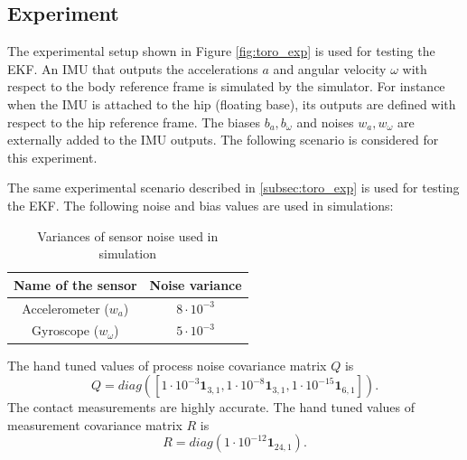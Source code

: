 \subsection{Experiment}

The experimental setup shown in Figure \ref{fig:toro_exp} is used for testing the EKF. An IMU that outputs the accelerations $a$ and angular velocity $\omega$ with respect to the body reference frame is simulated by the simulator. For instance when the IMU is attached to the hip (floating base), its outputs are defined with respect to the hip reference frame. The biases $b_a,b_\omega$ and noises $w_a,w_\omega$ are externally added to the IMU outputs. The following scenario is considered for this experiment. 

The same experimental scenario described in \ref{subsec:toro_exp} is used for testing the EKF. The following noise and bias values are used in simulations:

\begin{table}[H]
	\centering
	\begin{tabular}{|c|c|}
	\hline
	Name of the sensor &Noise variance \\ \hline
	Accelerometer ($w_a$) & $8 \cdot {10}^{-3}$ \\
	Gyroscope ($w_\omega$) & $5 \cdot {10}^{-3}$ \\ \hline	
	\end{tabular}
	\caption{Variances of sensor noise used in simulation}
	\label{tab:simp_noise}
\end{table}

The hand tuned values of process noise covariance matrix $Q$ is 
$$ Q = diag([ 1 \cdot {10}^{-3} \textbf{1}_{3,1}, 1 \cdot {10}^{-8} \textbf{1}_{3,1}, 1 \cdot {10}^{-15} \textbf{1}_{6,1}]). $$
The contact measurements are highly accurate. The hand tuned values of measurement covariance matrix $R$ is $$R = diag(1 \cdot {10}^{-12} \textbf{1}_{24,1}).$$


